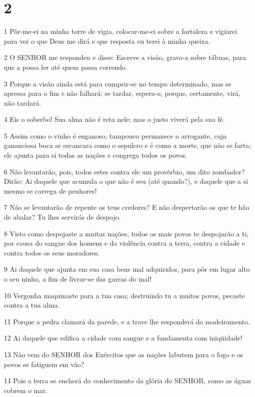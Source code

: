 \chapter{2}

\par 1 Pôr-me-ei na minha torre de vigia, colocar-me-ei sobre a fortaleza e vigiarei para ver o que Deus me dirá e que resposta eu terei à minha queixa.
\par 2 O SENHOR me respondeu e disse: Escreve a visão, grava-a sobre tábuas, para que a possa ler até quem passa correndo.
\par 3 Porque a visão ainda está para cumprir-se no tempo determinado, mas se apressa para o fim e não falhará; se tardar, espera-o, porque, certamente, virá, não tardará.
\par 4 Eis o soberbo! Sua alma não é reta nele; mas o justo viverá pela sua fé.
\par 5 Assim como o vinho é enganoso, tampouco permanece o arrogante, cuja gananciosa boca se escancara como o sepulcro e é como a morte, que não se farta; ele ajunta para si todas as nações e congrega todos os povos.
\par 6 Não levantarão, pois, todos estes contra ele um provérbio, um dito zombador? Dirão: Ai daquele que acumula o que não é seu (até quando?), e daquele que a si mesmo se carrega de penhores!
\par 7 Não se levantarão de repente os teus credores? E não despertarão os que te hão de abalar? Tu lhes servirás de despojo.
\par 8 Visto como despojaste a muitas nações, todos os mais povos te despojarão a ti, por causa do sangue dos homens e da violência contra a terra, contra a cidade e contra todos os seus moradores.
\par 9 Ai daquele que ajunta em sua casa bens mal adquiridos, para pôr em lugar alto o seu ninho, a fim de livrar-se das garras do mal!
\par 10 Vergonha maquinaste para a tua casa; destruindo tu a muitos povos, pecaste contra a tua alma.
\par 11 Porque a pedra clamará da parede, e a trave lhe responderá do madeiramento.
\par 12 Ai daquele que edifica a cidade com sangue e a fundamenta com iniqüidade!
\par 13 Não vem do SENHOR dos Exércitos que as nações labutem para o fogo e os povos se fatiguem em vão?
\par 14 Pois a terra se encherá do conhecimento da glória do SENHOR, como as águas cobrem o mar.
